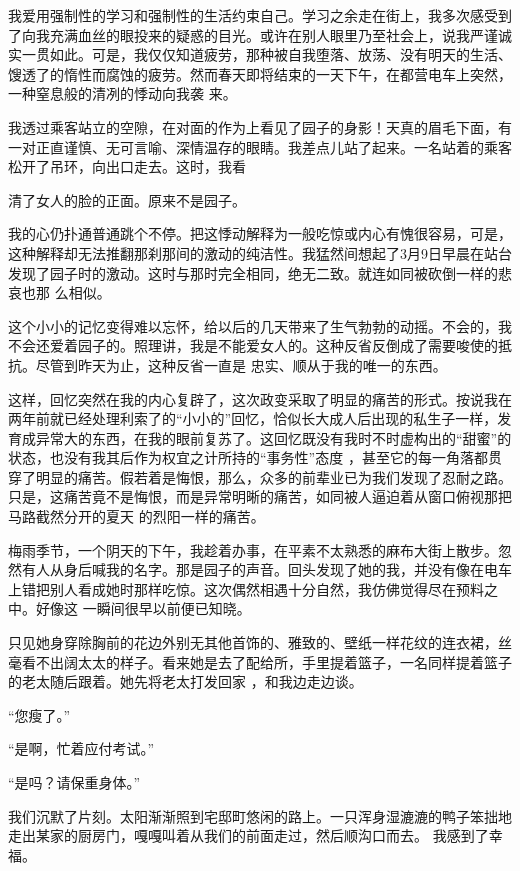 \documentclass{article}
\begin{document}
我爱用强制性的学习和强制性的生活约束自己。学习之余走在街上，我多次感受到了向我充满血丝的眼投来的疑惑的目光。或许在别人眼里乃至社会上，说我严谨诚实一贯如此。可是，我仅仅知道疲劳，那种被自我堕落、放荡、没有明天的生活、馊透了的惰性而腐蚀的疲劳。然而春天即将结束的一天下午，在都营电车上突然，一种窒息般的清冽的悸动向我袭
来。 

我透过乘客站立的空隙，在对面的作为上看见了园子的身影！天真的眉毛下面，有一对正直谨慎、无可言喻、深情温存的眼睛。我差点儿站了起来。一名站着的乘客松开了吊环，向出口走去。这时，我看
\newpage

清了女人的脸的正面。原来不是园子。 

我的心仍扑通普通跳个不停。把这悸动解释为一般吃惊或内心有愧很容易，可是，这种解释却无法推翻那刹那间的激动的纯洁性。我猛然间想起了3月9日早晨在站台发现了园子时的激动。这时与那时完全相同，绝无二致。就连如同被砍倒一样的悲哀也那
么相似。 

这个小小的记忆变得难以忘怀，给以后的几天带来了生气勃勃的动摇。不会的，我不会还爱着园子的。照理讲，我是不能爱女人的。这种反省反倒成了需要唆使的抵抗。尽管到昨天为止，这种反省一直是
忠实、顺从于我的唯一的东西。 

这样，回忆突然在我的内心复辟了，这次政变采取了明显的痛苦的形式。按说我在两年前就已经处理利索了的“小小的”回忆，恰似长大成人后出现的私生子一样，发育成异常大的东西，在我的眼前复苏了。这回忆既没有我时不时虚构出的“甜蜜”的状态，也没有我其后作为权宜之计所持的“事务性”态度
\newpage
，甚至它的每一角落都贯穿了明显的痛苦。假若着是悔恨，那么，众多的前辈业已为我们发现了忍耐之路。只是，这痛苦竟不是悔恨，而是异常明晰的痛苦，如同被人逼迫着从窗口俯视那把马路截然分开的夏天
的烈阳一样的痛苦。 

梅雨季节，一个阴天的下午，我趁着办事，在平素不太熟悉的麻布大街上散步。忽然有人从身后喊我的名字。那是园子的声音。回头发现了她的我，并没有像在电车上错把别人看成她时那样吃惊。这次偶然相遇十分自然，我仿佛觉得尽在预料之中。好像这
一瞬间很早以前便已知晓。 

只见她身穿除胸前的花边外别无其他首饰的、雅致的、壁纸一样花纹的连衣裙，丝毫看不出阔太太的样子。看来她是去了配给所，手里提着篮子，一名同样提着篮子的老太随后跟着。她先将老太打发回家
，和我边走边谈。 


“您瘦了。” 

\newpage


“是啊，忙着应付考试。” 


“是吗？请保重身体。” 

我们沉默了片刻。太阳渐渐照到宅邸町悠闲的路上。一只浑身湿漉漉的鸭子笨拙地走出某家的厨房门，嘎嘎叫着从我们的前面走过，然后顺沟口而去。
我感到了幸福。 
\end{document}
